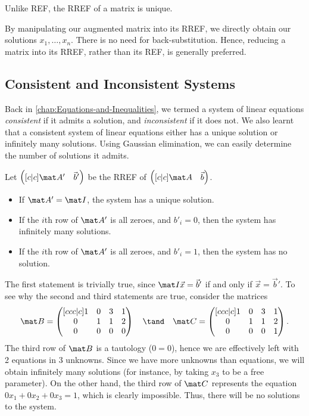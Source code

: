 Unlike REF, the RREF of a matrix is unique.

By manipulating our augmented matrix into its RREF, we directly obtain our solutions $x_1, \dots, x_n$. There is no need for back-substitution. Hence, reducing a matrix into its RREF, rather than its REF, is generally preferred.

\subsection{Consistent and Inconsistent Systems}

Back in \SS\ref{chap:Equations-and-Inequalities}, we termed a system of linear equations \emph{consistent} if it admits a solution, and \emph{inconsistent} if it does not. We also learnt that a consistent system of linear equations either has a unique solution or infinitely many solutions. Using Gaussian elimination, we can easily determine the number of solutions it admits.

\begin{proposition}
    Let $\begin{pmatrix}[c|c] \mat A' & \vec b'\end{pmatrix}$ be the RREF of $\begin{pmatrix}[c|c] \mat A & \vec b\end{pmatrix}$.
    \begin{itemize}
        \item If $\mat A' = \mat I$, the system has a unique solution.
        \item If the $i$th row of $\mat A'$ is all zeroes, and $b'_{i} = 0$, then the system has infinitely many solutions.
        \item If the $i$th row of $\mat A'$ is all zeroes, and $b'_{i} = 1$, then the system has no solution.
    \end{itemize}
\end{proposition}

The first statement is trivially true, since $\mat I \vec x = \vec b'$ if and only if $\vec x = \vec b'$. To see why the second and third statements are true, consider the matrices \[\mat B = \begin{pmatrix}[ccc|c] 1 & 0 & 3 & 1 \\ 0 & 1 & 1 & 2 \\ 0 & 0 & 0 & 0\end{pmatrix} \quad \tand \quad \mat C = \begin{pmatrix}[ccc|c] 1 & 0 & 3 & 1 \\ 0 & 1 & 1 & 2 \\ 0 & 0 & 0 & 1\end{pmatrix}.\] The third row of $\mat B$ is a tautology ($0 = 0$), hence we are effectively left with 2 equations in 3 unknowns. Since we have more unknowns than equations, we will obtain infinitely many solutions (for instance, by taking $x_3$ to be a free parameter). On the other hand, the third row of $\mat C$ represents the equation $0x_1 + 0x_2 + 0x_3 = 1$, which is clearly impossible. Thus, there will be no solutions to the system.

